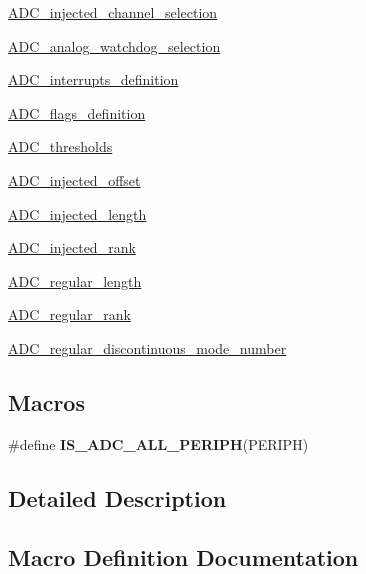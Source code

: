 \begin{DoxyCompactItemize}
\item 
\hyperlink{group___a_d_c__injected__channel__selection}{A\+D\+C\+\_\+injected\+\_\+channel\+\_\+selection}
\item 
\hyperlink{group___a_d_c__analog__watchdog__selection}{A\+D\+C\+\_\+analog\+\_\+watchdog\+\_\+selection}
\item 
\hyperlink{group___a_d_c__interrupts__definition}{A\+D\+C\+\_\+interrupts\+\_\+definition}
\item 
\hyperlink{group___a_d_c__flags__definition}{A\+D\+C\+\_\+flags\+\_\+definition}
\item 
\hyperlink{group___a_d_c__thresholds}{A\+D\+C\+\_\+thresholds}
\item 
\hyperlink{group___a_d_c__injected__offset}{A\+D\+C\+\_\+injected\+\_\+offset}
\item 
\hyperlink{group___a_d_c__injected__length}{A\+D\+C\+\_\+injected\+\_\+length}
\item 
\hyperlink{group___a_d_c__injected__rank}{A\+D\+C\+\_\+injected\+\_\+rank}
\item 
\hyperlink{group___a_d_c__regular__length}{A\+D\+C\+\_\+regular\+\_\+length}
\item 
\hyperlink{group___a_d_c__regular__rank}{A\+D\+C\+\_\+regular\+\_\+rank}
\item 
\hyperlink{group___a_d_c__regular__discontinuous__mode__number}{A\+D\+C\+\_\+regular\+\_\+discontinuous\+\_\+mode\+\_\+number}
\end{DoxyCompactItemize}
\subsection*{Macros}
\begin{DoxyCompactItemize}
\item 
\#define {\bfseries I\+S\+\_\+\+A\+D\+C\+\_\+\+A\+L\+L\+\_\+\+P\+E\+R\+I\+P\+H}(P\+E\+R\+I\+P\+H)
\end{DoxyCompactItemize}


\subsection{Detailed Description}


\subsection{Macro Definition Documentation}
\hypertarget{group___a_d_c___exported___constants_gaf5d6bd0153464912e0eaccb1af1aefb2}{}
